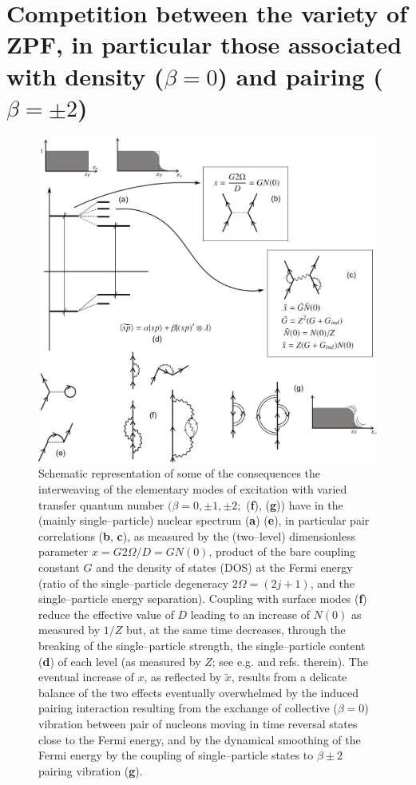 \section[Competition between ZPF]{Competition between the variety of ZPF, in particular those associated with density ($\beta=0$) and pairing ($\beta=\pm2$)}\label{appintroF}

\begin{figure}
\centerline {
\includegraphics*[width=12cm]{introduccion/figs/figintro6}
}
\caption{Schematic representation of some of the consequences the interweaving of the elementary modes of excitation with varied transfer quantum number $(\beta=0,\pm1,\pm2;$  (\textbf{f}), (\textbf{g})) have in the (mainly single--particle) nuclear spectrum (\textbf{a}) (\textbf{e}), in particular pair correlations (\textbf{b}, \textbf{c}), as measured by the (two--level) dimensionless parameter $x=G2\Omega/D=GN(0)$, product of the bare coupling constant $G$ and the density of states (DOS) at the Fermi energy (ratio of the single--particle degeneracy $2\Omega=(2j+1)$, and the single--particle energy separation). Coupling with surface modes (\textbf{f}) reduce the effective value of $D$ leading to an increase of $N(0)$ as measured by $1/Z$ but, at the same time decreases, through the breaking of the single--particle strength, the single--particle content (\textbf{d}) of each level (as measured by $Z$; see e.g. \cite{Barranco:05} and refs. therein). The eventual increase of $x$, as reflected by $\tilde x$, results from a delicate balance of the two effects eventually overwhelmed by the induced pairing interaction resulting from the exchange of collective ($\beta=0$) vibration between pair of nucleons moving in time reversal states close to the Fermi energy, and by the dynamical smoothing of the Fermi energy by the coupling of single--particle states to $\beta\pm2$ pairing vibration (\textbf{g}).}
\label{figintro6}
\end{figure}
